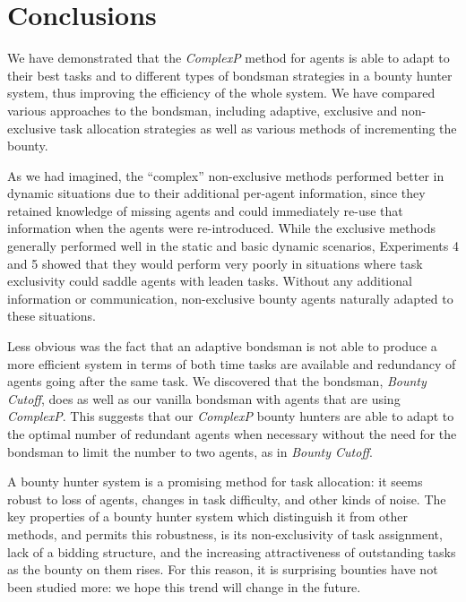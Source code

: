 \documentclass[letterpaper]{aamas2015}
\begin{document}
\vspace{-0.5em}
\section{Conclusions} 

We have demonstrated that the \textit{ComplexP} method for agents is able to adapt to their best tasks and to different types of bondsman strategies in a bounty hunter system, thus improving the efficiency of the whole system.  We have compared various approaches to the bondsman, including adaptive, exclusive and non-exclusive task allocation strategies as well as various methods of incrementing the bounty.

As we had imagined, the ``complex'' non-exclusive methods performed better in dynamic situations due to their additional per-agent information, since they retained knowledge of missing agents and could immediately re-use that information when the agents were re-introduced.    While the exclusive methods generally performed well in the static and basic dynamic scenarios, Experiments 4 and 5 showed that they would perform very poorly in situations where task exclusivity could saddle agents with leaden tasks.  Without any additional information or communication, non-exclusive bounty agents naturally adapted to these situations.

Less obvious was the fact that an adaptive bondsman is not able to produce a more efficient system in terms of both time tasks are available and redundancy of agents going after the same task.  We discovered that the bondsman, \textit{Bounty Cutoff}, does as well as our vanilla bondsman with agents that are using \textit{ComplexP}.  This suggests that our \textit{ComplexP} bounty hunters are able to adapt to the optimal number of redundant agents when necessary without the need for the bondsman to limit the number to two agents, as in \textit{Bounty Cutoff}.

A bounty hunter system is a promising method for task allocation: it seems robust to loss of agents, changes in task difficulty, and other kinds of noise.  The key properties of a bounty hunter system which distinguish it from other methods, and permits this robustness, is its non-exclusivity of task assignment, lack of a bidding structure, and the increasing attractiveness of outstanding tasks as the bounty on them rises.  For this reason, it is surprising bounties have not been studied more: we hope this trend will change in the future.


\vspace{-0.5em}


\end{document}
